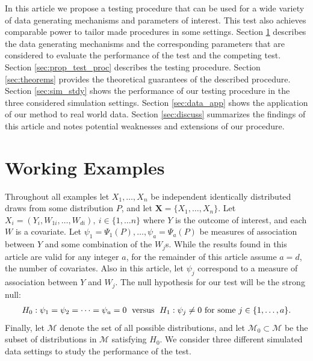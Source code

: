 \documentclass{article}
\newcommand{\rvo}{X}
\newcommand{\disto}{P}
\begin{document}
In this article we propose a testing procedure that can be used for a wide variety of data generating mechanisms and parameters of interest. This test also achieves comparable power to tailor made procedures in some settings. Section \ref{sec:Working Examples} describes the data generating mechanisms and the corresponding parameters that are considered to evaluate the performance of the test and the competing test.  Section \ref{sec:prop_test_proc} describes the testing procedure.  Section \ref{sec:theorems} provides the theoretical guarantees of the described procedure. Section \ref{sec:sim_stdy} shows the performance of our testing procedure in the three considered simulation settings. Section \ref{sec:data_app} shows the application of our method to real world data.  Section \ref{sec:discuss} summarizes the findings of this article and notes potential weaknesses and extensions of our procedure.


\section{Working Examples}
\label{sec:Working Examples}
Throughout all examples let $\rvo_1, \dots, \rvo_n$ be independent identically distributed draws from some distribution $\disto$, and let $\boldsymbol{\rvo} = \{\rvo_1, \dots, \rvo_n\}$. Let $\rvo_i = \left(Y_i, W_{1 i}, \dots, W_{d i}\right), \ i \in \{1, \dots n\}$ where $Y$ is the outcome of interest, and each $W$ is a covariate. Let $\psi_1 = \Psi_1(\disto), \dots, \psi_a = \Psi_a(\disto)$ be measures of association between $Y$ and some combination of the $W_j$s.  While the results found in this article are valid for any integer $a$, for the remainder of this article assume $a = d$, the number of covariates. Also in this article, let $\psi_j$ correspond to a measure of association between $Y$ and $W_j$.  The null hypothesis for our test will be the strong null: 
\begin{align*}
H_0: \psi_1 = \psi_2 = \dots = \psi_a = 0 \hspace{0.1cm}\text{  versus  } \hspace{0.1cm} H_1: \psi_j \neq 0 \text{ for some } j \in \{1, \dots, a\}.
\end{align*}
Finally, let $\mathscr{M}$ denote the set of all possible distributions, and let $\mathscr{M}_0  \subset \mathscr{M}$ be the subset of distributions in $\mathscr{M}$ satisfying $H_0$. We consider three different simulated data settings to study the performance of the test. 
\end{document}
